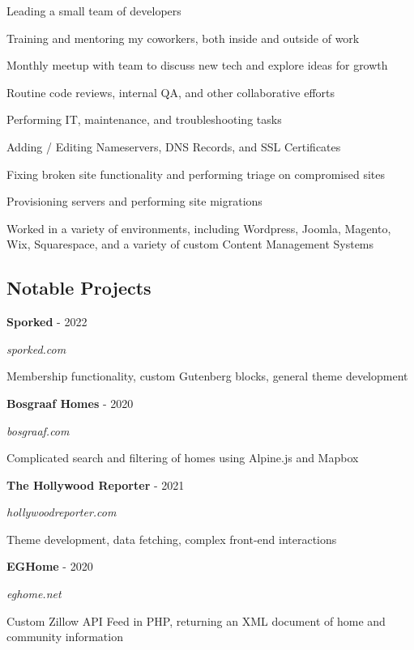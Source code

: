 \documentclass{article}
\newenvironment{narrow_list}{
	\begin{itemize}
		\setlength{\itemsep}{0pt}
		\setlength{\parskip}{-1pt}
		\setlength{\parsep}{0pt}
	}{\end{itemize}
}
\begin{document}
	Leading a small team of developers

	\begin{narrow_list}
		\item Training and mentoring my coworkers, both inside and outside of work
		\item Monthly meetup with team to discuss new tech and explore ideas for growth
		\item Routine code reviews, internal QA, and other collaborative efforts
	\end{narrow_list}

	Performing IT, maintenance, and troubleshooting tasks

	\begin{narrow_list}
		\item Adding / Editing Nameservers, DNS Records, and SSL Certificates
		\item Fixing broken site functionality and performing triage on compromised sites
		\item Provisioning servers and performing site migrations
		\item Worked in a variety of environments, including Wordpress, Joomla, Magento, Wix, Squarespace, and a variety of custom Content Management Systems
	\end{narrow_list}

	

	\vspace{3mm}

	\subsection*{Notable Projects}

	\vspace{0mm}

	\setlength{\columnsep}{1cm}

	\begin{multicols}{2}
		\textbf{Sporked} - 2022

		\textit{sporked.com}

		Membership functionality, custom Gutenberg blocks, general theme development

	\vspace{2mm}

		\textbf{Bosgraaf Homes} - 2020

		\textit{bosgraaf.com}
			
		Complicated search and filtering of homes using Alpine.js and Mapbox

	\columnbreak

		\textbf{The Hollywood Reporter} - 2021

		\textit{hollywoodreporter.com}

		Theme development, data fetching, complex front-end interactions

	\vspace{2mm}

		\textbf{EGHome} - 2020

		\textit{eghome.net}

		Custom Zillow API Feed in PHP, returning an XML document of home and community information

	\end{multicols}
\end{document}
